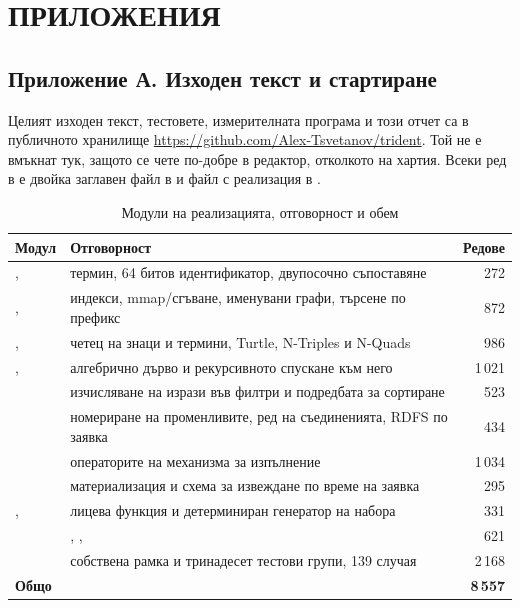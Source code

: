 \section*{ПРИЛОЖЕНИЯ}
\label{sec:appendix}

\subsection*{Приложение А. Изходен текст и стартиране}

Целият изходен текст, тестовете, измерителната програма и този отчет са в публичното хранилище
\url{https://github.com/Alex-Tsvetanov/trident}. Той не е вмъкнат тук, защото се чете по-добре
в редактор, отколкото на хартия. Всеки ред в  е двойка заглавен файл в
 и файл с реализация в .

\begin{table}[H]
\caption{Модули на реализацията, отговорност и обем}
\label{tab:modules}
\centering
\fontsize{9}{11}\selectfont
\setlength{\tabcolsep}{4pt}
\begin{tabular}{@{}L{2.9cm}L{8.5cm}r@{}}
\toprule
\textbf{Модул} & \textbf{Отговорност} & \textbf{Редове} \\
\midrule
{},  & термин, 64 битов идентификатор, двупосочно съпоставяне & 272 \\
,  & индекси, mmap/сгъване, именувани графи, търсене по префикс & 872 \\
,  & четец на знаци и термини, Turtle, N-Triples и N-Quads & 986 \\
,  & алгебрично дърво и рекурсивното спускане към него & 1\,021 \\
 & изчисляване на изрази във филтри и подредбата за сортиране & 523 \\
    & номериране на променливите, ред на съединенията, RDFS по заявка & 434 \\
       & операторите на механизма за изпълнение & 1\,034 \\
       & материализация и схема за извеждане по време на заявка & 295 \\
,  & лицева функция и детерминиран генератор на набора & 331 \\
     & , ,  & 621 \\
     & собствена рамка и тринадесет тестови групи, 139 случая & 2\,168 \\
\midrule
\textbf{Общо} & & \textbf{8\,557} \\
\bottomrule
\end{tabular}
\end{table}

